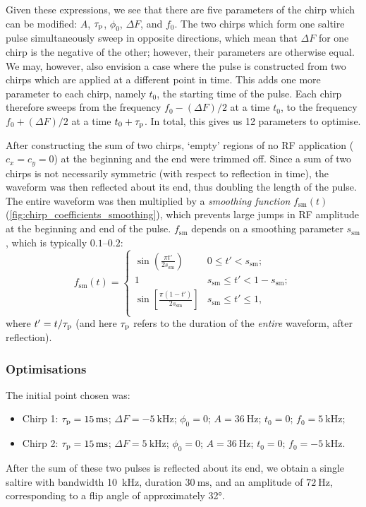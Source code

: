 Given these expressions, we see that there are five parameters of the chirp which can be modified: $A$, $\tau_\mathrm{p}$, $\phi_0$, $\Delta F$, and $f_0$.
The two chirps which form one saltire pulse simultaneously sweep in opposite directions, which mean that $\Delta F$ for one chirp is the negative of the other; however, their parameters are otherwise equal.
We may, however, also envision a case where the pulse is constructed from two chirps which are applied at a different point in time.
This adds one more parameter to each chirp, namely $t_0$, the starting time of the pulse.
Each chirp therefore sweeps from the frequency $f_0 - (\Delta F)/2$ at a time $t_0$, to the frequency $f_0 + (\Delta F)/2$ at a time $t_0 + \tau_\mathrm{p}$.
In total, this gives us 12 parameters to optimise.\autocite{Foroozandeh2020JMR,Verstraete2022JMR}

After constructing the sum of two chirps, `empty' regions of no RF application ($c_x = c_y = 0$) at the beginning and the end were trimmed off.
Since a sum of two chirps is not necessarily symmetric (with respect to reflection in time), the waveform was then reflected about its end, thus doubling the length of the pulse.
The entire waveform was then multiplied by a \textit{smoothing function} $f_\text{sm}(t)$ (\cref{fig:chirp_coefficients_smoothing}), which prevents large jumps in RF amplitude at the beginning and end of the pulse.
$f_\text{sm}$ depends on a smoothing parameter $s_\text{sm}$, which is typically $0.1$--$0.2$:
\begin{equation}
    \label{eq:sming_function}
    f_\text{sm}(t) = \begin{cases}
        \displaystyle \sin\left(\frac{\pi t'}{2 s_\text{sm}}\right) & 0 \leq t' < s_\text{sm}; \\
        \displaystyle 1 & s_\text{sm} \leq t' < 1 - s_\text{sm}; \\
        \displaystyle \sin\left[\frac{\pi (1 - t')}{2 s_\text{sm}}\right] & s_\text{sm} \leq t' \leq 1, \\
    \end{cases}
\end{equation}
where $t' = t/\tau_\mathrm{p}$ (and here $\tau_\mathrm{p}$ refers to the duration of the \textit{entire} waveform, after reflection).


\subsubsection{Optimisations}

The initial point chosen was:
\begin{itemize}
    \item Chirp 1: $\taup = \qty{15}{\ms}$; $\Delta F = \qty{-5}{\kHz}$; $\phi_0 = 0$; $A = \qty{36}{\Hz}$; $t_0 = 0$; $f_0 = \qty{5}{\kHz}$;
    \item Chirp 2: $\taup = \qty{15}{\ms}$; $\Delta F = \qty{5}{\kHz}$; $\phi_0 = 0$; $A = \qty{36}{\Hz}$; $t_0 = 0$; $f_0 = \qty{-5}{\kHz}$.
\end{itemize}
After the sum of these two pulses is reflected about its end, we obtain a single saltire with bandwidth \qty{10}{\kHz}, duration $\qty{30}{\ms}$, and an amplitude of $\qty{72}{\Hz}$, corresponding to a flip angle of approximately \ang{32}.

